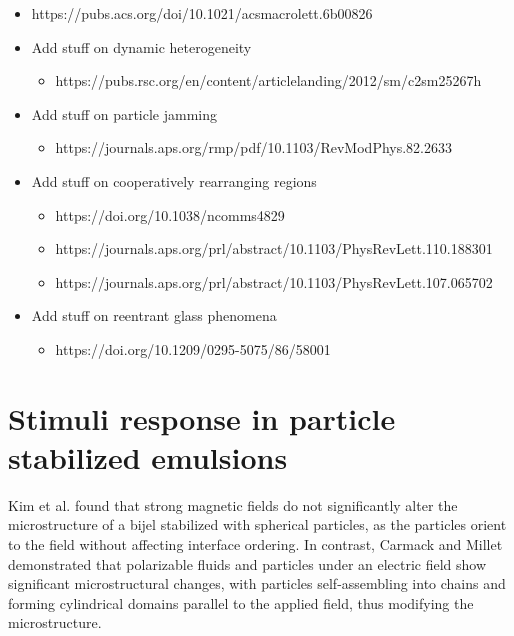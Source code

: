 \begin{itemize}
    \item https://pubs.acs.org/doi/10.1021/acsmacrolett.6b00826
    \item Add stuff on dynamic heterogeneity
    \begin{itemize}
        \item https://pubs.rsc.org/en/content/articlelanding/2012/sm/c2sm25267h
    \end{itemize}
    \item Add stuff on particle jamming
    \begin{itemize}
        \item https://journals.aps.org/rmp/pdf/10.1103/RevModPhys.82.2633
    \end{itemize}
    \item Add stuff on cooperatively rearranging regions
        \begin{itemize}
            \item https://doi.org/10.1038/ncomms4829
            \item https://journals.aps.org/prl/abstract/10.1103/PhysRevLett.110.188301
            \item https://journals.aps.org/prl/abstract/10.1103/PhysRevLett.107.065702
        \end{itemize}
    \item Add stuff on reentrant glass phenomena 
    \begin{itemize}
        \item https://doi.org/10.1209/0295-5075/86/58001
    \end{itemize}
\end{itemize}

\section{Stimuli response in particle stabilized emulsions}

Kim et al. found that strong magnetic fields do not significantly alter the microstructure of a bijel stabilized with spherical particles, as the particles orient to the field without affecting interface ordering. \cite{kim_bijels_2010} In contrast, Carmack and Millet demonstrated that polarizable fluids and particles under an electric field show significant microstructural changes, with particles self-assembling into chains and forming cylindrical domains parallel to the applied field, thus modifying the microstructure. \cite{carmack_tuning_2018}

